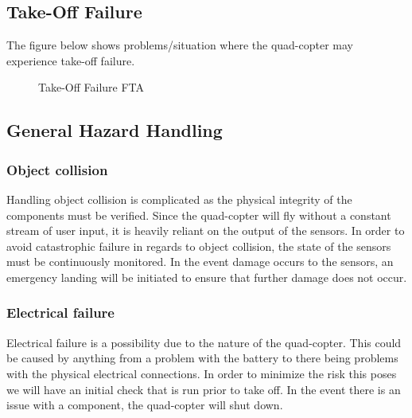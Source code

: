 \documentclass[10pt,letterpaper]{article}
\begin{document}
\newpage

\subsection{Take-Off Failure}
 The figure below shows problems/situation where the quad-copter may experience take-off failure.
\begin{figure}[h]
  \caption{Take-Off Failure FTA}
  \label{fig:context_diagram}
\end{figure}

\newpage


\subsection{General Hazard Handling}
\subsubsection{Object collision}
Handling object collision is complicated as the physical integrity of the components must be verified. Since the quad-copter will fly without a constant stream of user input, it is heavily reliant on the output of the sensors. In order to avoid catastrophic failure in regards to object collision, the state of the sensors must be continuously monitored. In the event damage occurs to the sensors, an emergency landing will be initiated to ensure that further damage does not occur.
\subsubsection{Electrical failure}
Electrical failure is a possibility due to the nature of the quad-copter. This could be caused by anything from a problem with the battery to there being problems with the physical electrical connections. In order to minimize the risk this poses we will have an initial check that is run prior to take off. In the event there is an issue with a component, the quad-copter will shut down.
\end{document}
